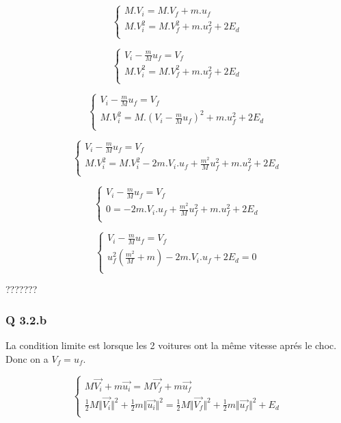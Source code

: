 \documentclass[]{book}
\theoremstyle{definition}
\begin{document}
$$
\left\{ 
\begin{array}{l}
 M.V_i = M.V_f + m.u_f \\
 M.V_i^2  = M.V_f^2 + m.u_f^2 + 2E_d\\
\end{array}
\right. 
$$

$$
\left\{ 
\begin{array}{l}
 V_i - \frac{m}{M}u_f = V_f  \\
 M.V_i^2  = M.V_f^2 + m.u_f^2 + 2E_d\\
\end{array}
\right. 
$$

$$
\left\{ 
\begin{array}{l}
 V_i - \frac{m}{M}u_f = V_f  \\
 M.V_i^2  = M.(V_i - \frac{m}{M}u_f)^2 + m.u_f^2 + 2E_d\\
\end{array}
\right. 
$$

$$
\left\{ 
\begin{array}{l}
 V_i - \frac{m}{M}u_f = V_f  \\
 M.V_i^2  = M.V_i^2 - 2m.V_i.u_f + \frac{m^2}{M}u_f^2 + m.u_f^2 + 2E_d\\
\end{array}
\right. 
$$

$$
\left\{ 
\begin{array}{l}
 V_i - \frac{m}{M}u_f = V_f  \\
 0 = - 2m.V_i.u_f + \frac{m^2}{M}u_f^2 + m.u_f^2 + 2E_d\\
\end{array}
\right. 
$$

$$
\left\{ 
\begin{array}{l}
 V_i - \frac{m}{M}u_f = V_f  \\
 u_f^2(\frac{m^2}{M} + m) - 2m.V_i.u_f + 2E_d = 0\\
\end{array}
\right. 
$$

???????


\subsubsection*{Q 3.2.b}
La condition limite est lorsque les 2 voitures ont la m\^eme vitesse apr\'es le choc. Donc on a $V_f = u_f$.

$$
\left\{ 
\begin{array}{l}
 M\overrightarrow{V_i} + m\overrightarrow{u_i} = M\overrightarrow{V_f} + m\overrightarrow{u_f} \\
 \frac{1}{2}M\Vert \overrightarrow{V_i} \Vert^2 + \frac{1}{2}m\Vert \overrightarrow{u_i} \Vert^2 = \frac{1}{2}M\Vert \overrightarrow{V_f} \Vert^2 + \frac{1}{2}m\Vert \overrightarrow{u_f} \Vert^2 + E_d\\
\end{array}
\right. 
$$
\end{document}
